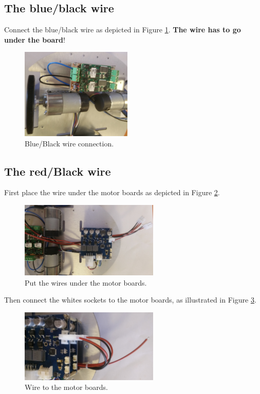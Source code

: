 \documentclass[10pt,a4paper]{report}   %
\begin{document}
\subsection{The blue/black wire}

Connect the blue/black wire as depicted in Figure \ref{fig:26}. \textbf{The wire has to go under the board}!

\begin{figure}[H]
\center
\includegraphics[width=200px]{images/26.jpg}
\caption{Blue/Black wire connection.}
\label{fig:26}
\end{figure}

\subsection{The red/Black wire}

First place the wire under the motor boards as depicted in Figure \ref{fig:27}.
 
\begin{figure}[H]
\center
\includegraphics[width=250px]{images/27.jpg}
\caption{Put the wires under the motor boards.}
\label{fig:27}
\end{figure}

Then connect the whites sockets to the motor boards, as illustrated in Figure \ref{fig:28}. 

\begin{figure}[H]
\center
\includegraphics[width=250px]{images/28.jpg}
\caption{Wire to the motor boards.}
\label{fig:28}
\end{figure}
\end{document}
